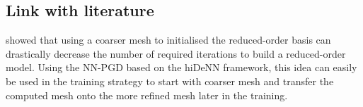 \subsection{Link with literature}

\cite{giacoma_toward_2015} showed that using a coarser mesh to initialised the reduced-order basis can drastically decrease the number of required iterations to build a reduced-order model. Using the NN-PGD based on the hiDeNN framework, this idea can easily be used in the training strategy to start with coarser mesh and transfer the computed mesh onto the more refined mesh later in the training.